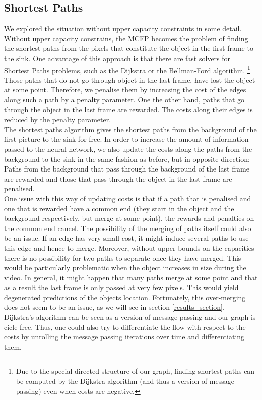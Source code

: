 \documentclass{article}
\begin{document}
\subsection{Shortest Paths}\label{shortestPaths}
We explored the situation without upper capacity constraints in some detail. Without upper capacity constrains, the MCFP becomes the problem of finding the shortest paths from the pixels that constitute the object in the first frame to the sink. One advantage of this approach is that there are fast solvers for Shortest Paths problems, such as the Dijkstra  or the Bellman-Ford algorithm.
\footnote{Due to the special directed structure of our graph, finding shortest paths can be computed by the Dijkstra algorithm (and thus a version of message passing) even when costs are negative.}
Those paths that do not go through object in the last frame, have lost the object at some point. Therefore, we penalise them by increasing the cost of the edges along such a path by a penalty parameter. One the other hand, paths that go through the object in the last frame are rewarded. The costs along their edges is reduced by the penalty parameter.\\
The shortest paths algorithm gives the shortest paths from the background of the first picture to the sink for free. In order to increase the amount of information passed to the neural network, we also update the costs along the paths from the background to the sink in the same fashion as before, but in opposite direction: Paths from the background that pass through the background of the last frame are rewarded and those that pass through the object in the last frame are penalised.\\
One issue with this way of updating costs is that if a path that is penalised and one that is rewarded have a common end (they start in the object and the background respectively, but merge at some point), the rewards and penalties on the common end cancel. The possibility of the merging of paths itself could also be an issue. If an edge has very small cost, it might induce several paths to use this edge and hence to merge. Moreover, without upper bounds on the capacities there is no possibility for two paths to separate once they have merged. This would be particularly problematic when the object increases in size during the video. In general, it might happen that many paths merge at some point and that as a result the last frame is only passed at very few pixels. This would yield degenerated predictions of the objects location. Fortunately, this over-merging does not seem to be an issue, as we will see in section \ref{results_section}.\\
Dijkstra's algorithm can be seen as a version of message passing and our graph is cicle-free. Thus, one could also try to differentiate the flow with respect to the costs by unrolling the message passing iterations over time and differentiating them.
\end{document}
